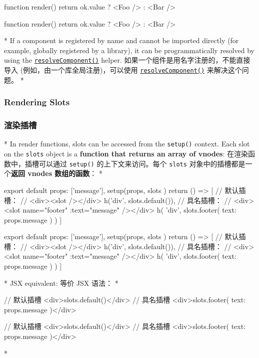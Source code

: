 \begin{paracol}{2}
\begin{codeHtml}
function render() {
  return ok.value ? <Foo /> : <Bar />
}
\end{codeHtml}
\switchcolumn
\begin{codeHtml}
function render() {
  return ok.value ? <Foo /> : <Bar />
}
\end{codeHtml}
\switchcolumn[0]*%
If a component is registered by name and cannot be imported directly
(for example, globally registered by a library), it can be
programmatically resolved by using the
\href{https://vuejs.org/api/render-function.html\#resolvecomponent}{\texttt{resolveComponent()}}
helper.
\switchcolumn
如果一个组件是用名字注册的，不能直接导入
(例如，由一个库全局注册)，可以使用
\href{https://cn.vuejs.org/api/render-function.html\#resolvecomponent}{\texttt{resolveComponent()}}
来解决这个问题。
\switchcolumn[0]*%
\subsubsection{Rendering Slots}
\switchcolumn
\subsubsection{渲染插槽}
\switchcolumn[0]*%
In render functions, slots can be accessed from the \texttt{setup()}
context. Each slot on the \texttt{slots} object is a \textbf{function
that returns an array of vnodes}:
\switchcolumn
在渲染函数中，插槽可以通过 \texttt{setup()} 的上下文来访问。每个
\texttt{slots} 对象中的插槽都是一个\textbf{返回 vnodes 数组的函数}：
\switchcolumn[0]*%
\begin{codeJs}
export default {
  props: ['message'],
  setup(props, { slots }) {
    return () => [
      // 默认插槽：
      // <div><slot /></div>
      h('div', slots.default()),
      // 具名插槽：
      // <div><slot name="footer" :text="message" /></div>
      h(
        'div',
        slots.footer({
          text: props.message
        })
      )
    ]
  }
}
\end{codeJs}
\switchcolumn
\begin{codeJs}
export default {
  props: ['message'],
  setup(props, { slots }) {
    return () => [
      // 默认插槽：
      // <div><slot /></div>
      h('div', slots.default()),
      // 具名插槽：
      // <div><slot name="footer" :text="message" /></div>
      h(
        'div',
        slots.footer({
          text: props.message
        })
      )
    ]
  }
}
\end{codeJs}
\switchcolumn[0]*%
JSX equivalent:
\switchcolumn
等价 JSX 语法：
\switchcolumn[0]*%
\begin{codeHtml}
// 默认插槽
<div>{slots.default()}</div>
// 具名插槽
<div>{slots.footer({ text: props.message })}</div>
\end{codeHtml}
\switchcolumn
\begin{codeHtml}
// 默认插槽
<div>{slots.default()}</div>
// 具名插槽
<div>{slots.footer({ text: props.message })}</div>
\end{codeHtml}
\switchcolumn[0]*%

\end{paracol}
